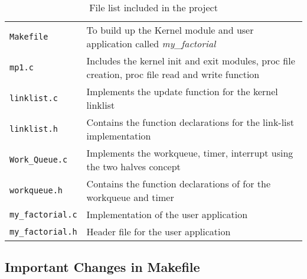 \documentclass[11pt]{article}
\begin{document}
\begin{table*}[h]
  \centering
  \rcow
  \caption{File list included in the project}
  \begin{tabular}{|p{4cm}|p{8cm}|}
    {\tt Makefile}  &  To build up the Kernel module and user application called {\em my\_factorial}  \\
    {\tt mp1.c}     &  Includes the kernel init and exit modules, proc file creation, proc file read and write function  \\
    {\tt linklist.c}&  Implements the update function for the kernel linklist\\
    {\tt linklist.h}&  Contains the function declarations for the link-list implementation\\
    {\tt Work\_Queue.c}  & Implements the workqueue, timer, interrupt using the two halves concept \\
    {\tt workqueue.h}   & Contains the function declarations of for the workqueue and timer\\
    {\tt my\_factorial.c}    & Implementation of the user application \\
    {\tt my\_factorial.h}    & Header file for the user application\\
  \end{tabular}
\end{table*}

\subsection{Important Changes in Makefile}\label{subsec:Make}
\end{document}
